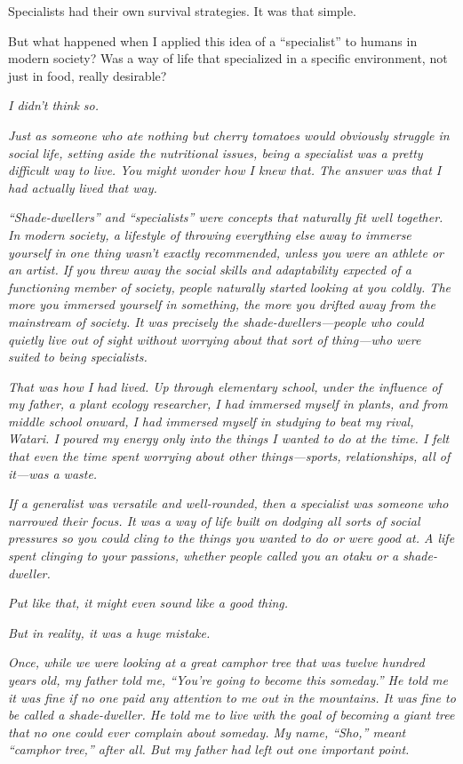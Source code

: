 \documentclass[
    a4paper,
    12pt,
    twoside,
    openany,
    UTF8,
    fontset=windows
]{ctexbook}
\begin{document}
Specialists had their own survival strategies. It was that simple.

But what happened when I applied this idea of a ``specialist'' to humans in modern society? Was a way of life that specialized in a specific environment, not just in food, really desirable?

\textit{I didn't think so.}

\textit{Just as someone who ate nothing but cherry tomatoes would obviously struggle in social life, setting aside the nutritional issues, being a specialist was a pretty difficult way to live. You might wonder how I knew that. The answer was that I had actually lived that way.}

\textit{``Shade-dwellers'' and ``specialists'' were concepts that naturally fit well together. In modern society, a lifestyle of throwing everything else away to immerse yourself in one thing wasn't exactly recommended, unless you were an athlete or an artist. If you threw away the social skills and adaptability expected of a functioning member of society, people naturally started looking at you coldly. The more you immersed yourself in something, the more you drifted away from the mainstream of society. It was precisely the shade-dwellers---people who could quietly live out of sight without worrying about that sort of thing---who were suited to being specialists.}

\textit{That was how I had lived. Up through elementary school, under the influence of my father, a plant ecology researcher, I had immersed myself in plants, and from middle school onward, I had immersed myself in studying to beat my rival, Watari. I poured my energy only into the things I wanted to do at the time. I felt that even the time spent worrying about other things---sports, relationships, all of it---was a waste.}

\textit{If a generalist was versatile and well-rounded, then a specialist was someone who narrowed their focus. It was a way of life built on dodging all sorts of social pressures so you could cling to the things you wanted to do or were good at. A life spent clinging to your passions, whether people called you an otaku or a shade-dweller.}

\textit{Put like that, it might even sound like a good thing.}

\textit{But in reality, it was a huge mistake.}

\textit{Once, while we were looking at a great camphor tree that was twelve hundred years old, my father told me, ``You're going to become this someday.'' He told me it was fine if no one paid any attention to me out in the mountains. It was fine to be called a shade-dweller. He told me to live with the goal of becoming a giant tree that no one could ever complain about someday. My name, ``Sho,'' meant ``camphor tree,'' after all. But my father had left out one important point.}
\end{document}
